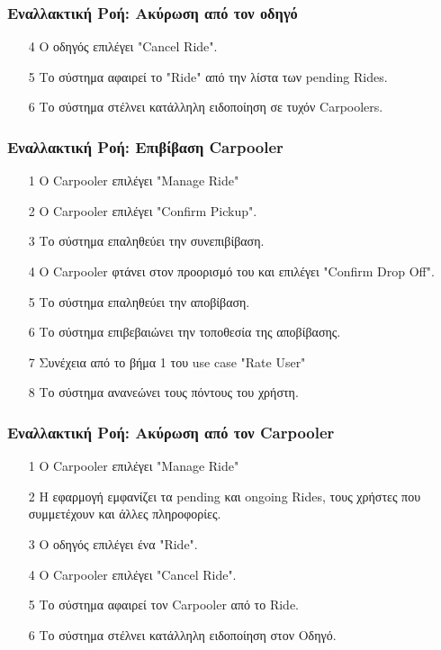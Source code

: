 \subsubsection{Εναλλακτική Ροή: Ακύρωση από τον οδηγό}

\begin{enumerate}
    \item[4] O οδηγός επιλέγει "Cancel Ride".
    \item[5] Το σύστημα αφαιρεί το "Ride" από την λίστα των pending Rides.
    \item[6] Το σύστημα στέλνει κατάλληλη ειδοποίηση σε τυχόν Carpoolers.
\end{enumerate}

\subsubsection{Εναλλακτική Ροή: Επιβίβαση Carpooler}

\begin{enumerate}
    \item[1] O Carpooler επιλέγει "Manage Ride"
    \item[2] Ο Carpooler επιλέγει "Confirm Pickup".
    \item[3] Το σύστημα επαληθεύει την συνεπιβίβαση.
    \item[4] O Carpooler φτάνει στον προορισμό του και επιλέγει "Confirm Drop Off".
    \item[5] Το σύστημα επαληθεύει την αποβίβαση.
    \item[6] Το σύστημα επιβεβαιώνει την τοποθεσία της αποβίβασης.
    \item[7] Συνέχεια από το βήμα 1 του use case "Rate User"
    \item[8] Το σύστημα ανανεώνει τους πόντους του χρήστη.
\end{enumerate}

\subsubsection{Εναλλακτική Ροή: Ακύρωση από τον Carpooler}

\begin{enumerate}
    \item[1] O Carpooler επιλέγει "Manage Ride"
    \item[2] Η εφαρμογή εμφανίζει τα pending και ongoing Rides, τους χρήστες που συμμετέχουν και άλλες
        πληροφορίες.
    \item[3] Ο οδηγός επιλέγει ένα "Ride".
    \item[4] Ο Carpooler επιλέγει "Cancel Ride".
    \item[5] Το σύστημα αφαιρεί τον Carpooler από το Ride.
    \item[6] Το σύστημα στέλνει κατάλληλη ειδοποίηση στον Οδηγό.
\end{enumerate}

